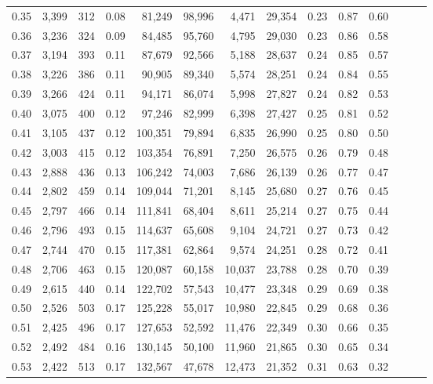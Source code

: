\begin{tabular}{rrrrrrrrrrrrrr}
0.35 &  3,399 &  312 &  0.08 &   81,249 &   98,996 &   4,471 &  29,354 &  0.23 &  0.87 &      0.60 \\
0.36 &  3,236 &  324 &  0.09 &   84,485 &   95,760 &   4,795 &  29,030 &  0.23 &  0.86 &      0.58 \\
0.37 &  3,194 &  393 &  0.11 &   87,679 &   92,566 &   5,188 &  28,637 &  0.24 &  0.85 &      0.57 \\
0.38 &  3,226 &  386 &  0.11 &   90,905 &   89,340 &   5,574 &  28,251 &  0.24 &  0.84 &      0.55 \\
0.39 &  3,266 &  424 &  0.11 &   94,171 &   86,074 &   5,998 &  27,827 &  0.24 &  0.82 &      0.53 \\
0.40 &  3,075 &  400 &  0.12 &   97,246 &   82,999 &   6,398 &  27,427 &  0.25 &  0.81 &      0.52 \\
0.41 &  3,105 &  437 &  0.12 &  100,351 &   79,894 &   6,835 &  26,990 &  0.25 &  0.80 &      0.50 \\
0.42 &  3,003 &  415 &  0.12 &  103,354 &   76,891 &   7,250 &  26,575 &  0.26 &  0.79 &      0.48 \\
0.43 &  2,888 &  436 &  0.13 &  106,242 &   74,003 &   7,686 &  26,139 &  0.26 &  0.77 &      0.47 \\
0.44 &  2,802 &  459 &  0.14 &  109,044 &   71,201 &   8,145 &  25,680 &  0.27 &  0.76 &      0.45 \\
0.45 &  2,797 &  466 &  0.14 &  111,841 &   68,404 &   8,611 &  25,214 &  0.27 &  0.75 &      0.44 \\
0.46 &  2,796 &  493 &  0.15 &  114,637 &   65,608 &   9,104 &  24,721 &  0.27 &  0.73 &      0.42 \\
0.47 &  2,744 &  470 &  0.15 &  117,381 &   62,864 &   9,574 &  24,251 &  0.28 &  0.72 &      0.41 \\
0.48 &  2,706 &  463 &  0.15 &  120,087 &   60,158 &  10,037 &  23,788 &  0.28 &  0.70 &      0.39 \\
0.49 &  2,615 &  440 &  0.14 &  122,702 &   57,543 &  10,477 &  23,348 &  0.29 &  0.69 &      0.38 \\
0.50 &  2,526 &  503 &  0.17 &  125,228 &   55,017 &  10,980 &  22,845 &  0.29 &  0.68 &      0.36 \\
0.51 &  2,425 &  496 &  0.17 &  127,653 &   52,592 &  11,476 &  22,349 &  0.30 &  0.66 &      0.35 \\
0.52 &  2,492 &  484 &  0.16 &  130,145 &   50,100 &  11,960 &  21,865 &  0.30 &  0.65 &      0.34 \\
0.53 &  2,422 &  513 &  0.17 &  132,567 &   47,678 &  12,473 &  21,352 &  0.31 &  0.63 &      0.32 \\

\end{tabular}
